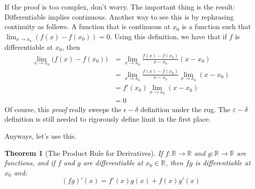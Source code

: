 \documentclass{article}
\theoremstyle{plain}
\newtheorem{theorem}{Theorem}
\begin{document}
    If the proof is too complex, don't worry. The important thing is the
    result: Differentiable implies continuous. Another way to see this is by
    rephrasing continuity as follows. A function that is continuous at $x_{0}$
    is a function such that $\lim_{x\rightarrow{x_{0}}}(f(x)-f(x_{0}))=0$. Using
    this definition, we have that if $f$ is differentiable at $x_{0}$, then
    \begin{align}
        \lim_{x\rightarrow{x}_{0}}\big(f(x)-f(x_{0})\big)
        &=\lim_{x\rightarrow{x}_{0}}\frac{f(x)-f(x_{0})}{x-x_{0}}(x-x_{0})\\
        &=\lim_{x\rightarrow{x}_{0}}\frac{f(x)-f(x_{0})}{x-x_{0}}
            \lim_{x\rightarrow{x_{0}}}(x-x_{0})\\
        &=f'(x_{0})\lim_{x\rightarrow{x}_{0}}(x-x_{0})\\
        &=0
    \end{align}
    Of course, this \textit{proof} really sweeps the $\epsilon-\delta$
    definition under the rug. The $\varepsilon-\delta$ definition is still
    needed to rigorously define limit in the first place.
    \par\hfill\par
    Anyways, let's use this.
    \begin{theorem}[The Product Rule for Derivatives]
        If $f:\mathbb{R}\rightarrow\mathbb{R}$ and
        $g:\mathbb{R}\rightarrow\mathbb{R}$ are functions, and if $f$ and $g$
        are differentiable at $x_{0}\in\mathbb{R}$, then $fg$ is differentiable
        at $x_{0}$ and:
        \begin{equation}
            (fg)'(x)=f'(x)g(x)+f(x)g'(x)
        \end{equation}
    \end{theorem}
\end{document}
